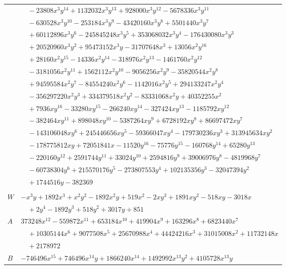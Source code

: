\documentclass[11pt]{article}
\begin{document}
\begin{longtable}{@{}ll@{}}
 & $\quad -23808x^{3}y^{14}+1132032x^{3}y^{13}+928000x^{3}y^{12}-5678336x^{3}y^{11}$\\
 & $\quad -630528x^{3}y^{10}-253184x^{3}y^{9}-43420160x^{3}y^{8}+5501440x^{3}y^{7}$\\
 & $\quad +60112896x^{3}y^{6}-245845248x^{3}y^{5}+353068032x^{3}y^{4}-176430080x^{3}y^{3}$\\
 & $\quad +20520960x^{3}y^{2}+95473152x^{3}y-31707648x^{3}+13056x^{2}y^{16}$\\
 & $\quad +28160x^{2}y^{15}-14336x^{2}y^{14}-318976x^{2}y^{13}-1461760x^{2}y^{12}$\\
 & $\quad -3181056x^{2}y^{11}+1562112x^{2}y^{10}-9056256x^{2}y^{9}-35820544x^{2}y^{8}$\\
 & $\quad +94595584x^{2}y^{7}-84554240x^{2}y^{6}-1142016x^{2}y^{5}+294133247x^{2}y^{4}$\\
 & $\quad -356297220x^{2}y^{3}+334379518x^{2}y^{2}-83331068x^{2}y+40352255x^{2}$\\
 & $\quad +7936xy^{16}-33280xy^{15}-266240xy^{14}-327424xy^{13}-1185792xy^{12}$\\
 & $\quad -382464xy^{11}+898048xy^{10}-5387264xy^{9}+6728192xy^{8}+86697472xy^{7}$\\
 & $\quad -143106048xy^{6}+245446656xy^{5}-59366047xy^{4}-179730236xy^{3}+313945634xy^{2}$\\
 & $\quad -178775812xy+72051841x-11520y^{16}-75776y^{15}-160768y^{14}+65280y^{13}$\\
 & $\quad -220160y^{12}+2591744y^{11}+33024y^{10}+2594816y^{9}+39006976y^{8}-4819968y^{7}$\\
 & $\quad -60738304y^{6}+215570176y^{5}-273807553y^{4}+102135356y^{3}-32047394y^{2}$\\
 & $\quad +1744516y-382369$\\
\addlinespace[3pt]
\multicolumn{2}{@{}l}{$i=45$, $m=864$, neighbours $2,26,53,68,123$}\\
$W$ & $-x^{3}y+1892x^{3}+x^{2}y^{2}-1892x^{2}y+519x^{2}-2xy^{3}+1891xy^{2}-518xy-3018x$\\
 & $\quad +2y^{4}-1892y^{3}+518y^{2}+3017y+851$\\
$A$ & $373248x^{12}-559872x^{11}+653184x^{10}+419904x^{9}+163296x^{8}+6823440x^{7}$\\
 & $\quad +10305144x^{6}+9077508x^{5}+25670988x^{4}+44424216x^{3}+31015008x^{2}+11732148x$\\
 & $\quad +2178972$\\
$B$ & $-746496x^{15}+746496x^{14}y+1866240x^{14}+1492992x^{13}y^{2}+4105728x^{13}y$\\

\end{longtable}
\end{document}

